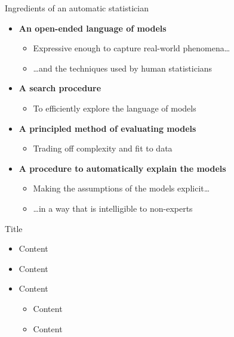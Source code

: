 \begin{frame}{Ingredients of an automatic statistician}
  \begin{center}
    \scalebox{0.5}{}
  \end{center}
  \begin{itemize}
    \footnotesize
    \item {\bf An open-ended language of models}
    \begin{itemize}
       \item Expressive enough to capture real-world phenomena\ldots
       \item \ldots and the techniques used by human statisticians
     \end{itemize}
    \item {\bf A search procedure}
    \begin{itemize}
       \item To efficiently explore the language of models
     \end{itemize}
    \item {\bf A principled method of evaluating models}
    \begin{itemize}
       \item Trading off complexity and fit to data
     \end{itemize}
    \item {\bf A procedure to automatically explain the models}
    \begin{itemize}
       \item Making the assumptions of the models explicit\ldots
       \item \ldots in a way that is intelligible to non-experts
     \end{itemize}
  \end{itemize}
\end{frame}



\begin{frame}{Title}
  \begin{itemize}
    \item Content
    \vspace{\baselineskip}
    \item Content
    \vspace{\baselineskip}
    \item Content
    \begin{itemize}
       \item Content
       \item Content
     \end{itemize}
  \end{itemize}
\end{frame}
